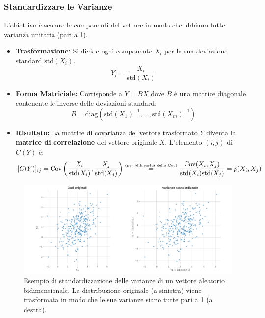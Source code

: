 \subsubsection{Standardizzare le Varianze}
L'obiettivo è scalare le componenti del vettore in modo che abbiano tutte
varianza unitaria (pari a 1).
\begin{itemize}
    \item \textbf{Trasformazione:} Si divide ogni componente \(X_i\) per la sua
    deviazione standard \(\text{std}(X_i)\).
    \[ Y_i = \frac{X_i}{\text{std}(X_i)} \]
    \item \textbf{Forma Matriciale:} Corrisponde a \(Y = BX\) dove \(B\) è una
    matrice diagonale contenente le inverse delle deviazioni standard:
    \[ B = \text{diag}(\text{std}(X_1)^{-1}, \dots, \text{std}(X_m)^{-1}) \]
\item \textbf{Risultato:} La matrice di covarianza del vettore trasformato \(Y\)
diventa la \textbf{matrice di correlazione} del vettore originale \(X\).
L'elemento \((i,j)\) di \(C(Y)\) è:
\[
    [C(Y)]_{ij} = \text{Cov}\left(\frac{X_i}{\text{std}(X_i)}, \frac{X_j}{\text{std}(X_j)}\right)
    \stackrel{\text{\tiny(per bilinearità della Cov)}}{=} \frac{\text{Cov}(X_i, X_j)}{\text{std}(X_i)\text{std}(X_j)}
    = \rho(X_i, X_j)
\]
\end{itemize}

\begin{figure}[H]
    \centering
    \includegraphics[width=\textwidth]{images/th_07_09/standardize_variances.png}
    \caption{Esempio di standardizzazione delle varianze di un vettore aleatorio bidimensionale. La distribuzione originale (a sinistra) viene trasformata in modo che le sue varianze siano tutte pari a 1 (a destra).}
    \label{fig:standardize_variances}
\end{figure}

